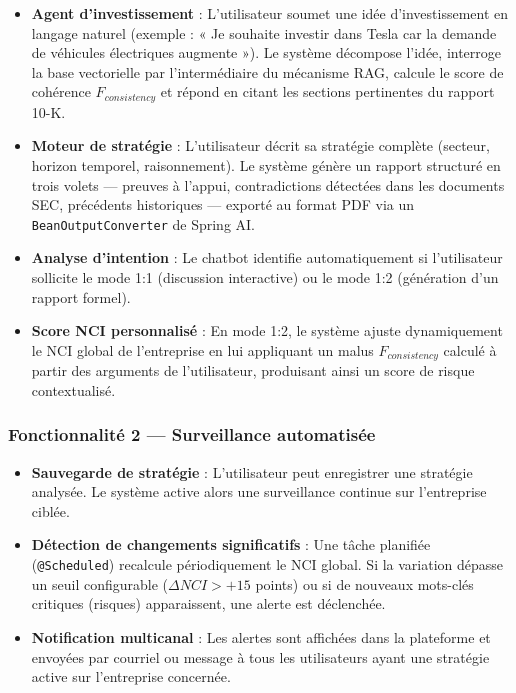\begin{itemize}
    \item \textbf{Agent d’investissement } : L’utilisateur soumet une idée 
    d’investissement en langage naturel (exemple : « Je souhaite investir dans Tesla 
    car la demande de véhicules électriques augmente »). Le système décompose l’idée, 
    interroge la base vectorielle par l’intermédiaire du mécanisme RAG, calcule le 
    score de cohérence $F_{consistency}$ et répond en citant les sections pertinentes 
    du rapport 10-K.

    \item \textbf{Moteur de stratégie } : L’utilisateur décrit sa stratégie 
    complète (secteur, horizon temporel, raisonnement). Le système génère un rapport 
    structuré en trois volets — preuves à l’appui, contradictions détectées dans les 
    documents SEC, précédents historiques — exporté au format PDF via un 
    \texttt{BeanOutputConverter} de Spring AI.

    \item \textbf{Analyse d’intention} : Le chatbot identifie automatiquement si 
    l’utilisateur sollicite le mode 1:1 (discussion interactive) ou le mode 1:2 
    (génération d’un rapport formel).

    \item \textbf{Score NCI personnalisé} : En mode 1:2, le système ajuste 
    dynamiquement le NCI global de l’entreprise en lui appliquant un malus 
    $F_{consistency}$ calculé à partir des arguments de l’utilisateur, produisant 
    ainsi un score de risque contextualisé.
\end{itemize}

\subsubsection{Fonctionnalité 2 — Surveillance automatisée}

\begin{itemize}
    \item \textbf{Sauvegarde de stratégie} : L’utilisateur peut enregistrer une 
    stratégie analysée. Le système active alors une surveillance continue sur 
    l’entreprise ciblée.

    \item \textbf{Détection de changements significatifs} : Une tâche planifiée 
    (\texttt{@Scheduled}) recalcule périodiquement le NCI global. Si la variation 
    dépasse un seuil configurable ($\Delta NCI > +15$ points) ou si de nouveaux 
    mots-clés critiques (risques) apparaissent, une alerte est déclenchée.

    \item \textbf{Notification multicanal} : Les alertes sont affichées dans la 
    plateforme et envoyées par courriel ou message à tous les utilisateurs ayant une 
    stratégie active sur l’entreprise concernée.
\end{itemize}

